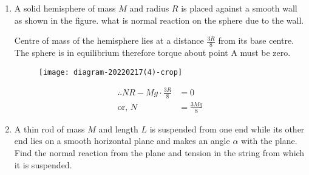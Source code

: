 \begin{enumerate}
\begin{answer}
\begin{align}
 \frac{1}{2} m u_{1}^{2}&=\frac{1}{2} m v_{1}^{2}+\frac{1}{2}(2 m) v_{2}^{2}\notag \\ \text { or } & u_{1}^{2}-v_{1}^{2}=2 v_{2}^{2} \notag\\ \text { or } & \left(u_{1}-v_{1}\right)\left(u_{1}+v_{1}\right)=2 v_{2}^{2}\label{10}
\intertext{ By the law of conservation of momentum, we have}\notag
 m u_{1}&=m v_{1}+(2 m) v_{2} \notag\\
 \left(u_{1}-v_{1}\right)&=2 v_{2}\label{11}\\
\text{ From eqs. (\ref{10}) and (\ref{11}), we get }\left(u_{1}+v_{1}\right)&=v_{2}\label{12}
\intertext{ Substituting the value of $v_{2}$ from eq. (\ref{12}) in eq. (\ref{11}), we get}\notag\\
u_{1}-v_{1}=2\left(u_{1}+v_{1}\right) \text { or }-3 v_{1}&=u_{1} \text { or } v_{1}=-\left(\frac{1}{3}\right) u_{1}\label{13}
\intertext{Now the initial and final kinetic energies of mass $m$ are}
K_{i}=\left(\frac{1}{2}\right) m u_{1}^{2} \text { and } K_{f}&=\left(\frac{1}{2}\right) m v_{1}^{2}=\left(\frac{1}{2}\right) m\left(\frac{u_{1}^{2}}{9}\right)\notag\\
\text{Therefore, fraction loss }&=\frac{K_{i}-K_{f}}{K_{i}}=\frac{\frac{1}{2} m u_{1}^{2}\left(1-\frac{1}{9}\right)}{\frac{1}{2} m u_{1}^{2}}=\frac{8}{9}\notag
	\end{align}
\end{answer}
\item A solid hemisphere of mass $M$ and radius $R$ is placed against a smooth wall as shown in the figure. what is normal reaction on the sphere due to the wall.
\begin{answer}
	Centre of mass of the hemisphere lies at a distance $\frac{3 R}{8}$ from
	its base centre. The sphere is in equilibrium therefore torque about point A must be zero.
	\begin{figure}[H]
		\centering
		\texttt{[image: diagram-20220217(4)-crop]}
	\end{figure}
	\begin{align*}
	\therefore N R-M g \cdot \frac{3 R}{8}&=0\\
	\text{or, }N&=\frac{3 M g}{8}
	\end{align*}
\end{answer}
\item A thin rod of mass $M$ and length $L$ is suspended from one end while its other end lies on a smooth horizontal plane and makes an angle $\alpha$ with the plane. Find the normal reaction from the plane and tension in the string from which it is suspended.

\end{enumerate}
